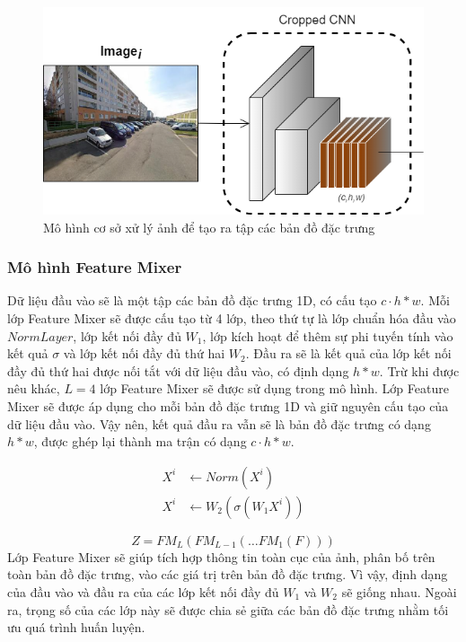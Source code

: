 \begin{figure}[H]
  \centering
  \includegraphics[scale=0.6]{pics/Proposal/cropped-cnn.png}
  \caption{Mô hình cơ sở xử lý ảnh để tạo ra tập các bản đồ đặc trưng \cite{alibey2023mixvpr}}
\end{figure}

\subsubsection{Mô hình Feature Mixer}

Dữ liệu đầu vào sẽ là một tập các bản đồ đặc trưng 1D, có cấu tạo $c \cdot h*w$. Mỗi lớp Feature Mixer sẽ được cấu tạo từ 4 lớp, theo thứ tự là lớp chuẩn hóa đầu vào $NormLayer$, lớp kết nối đầy đủ $W_1$, lớp kích hoạt để thêm sự phi tuyến tính vào kết quả $\sigma$ và lớp kết nối đầy đủ thứ hai $W_2$. Đầu ra sẽ là kết quả của lớp kết nối đầy đủ thứ hai được nối tắt với dữ liệu đầu vào, có định dạng $h*w$. Trừ khi được nêu khác, $L=4$ lớp Feature Mixer sẽ được sử dụng trong mô hình. Lớp Feature Mixer sẽ được áp dụng cho mỗi bản đồ đặc trưng 1D và giữ nguyên cấu tạo của dữ liệu đầu vào. Vậy nên, kết quả đầu ra vẫn sẽ là bản đồ đặc trưng có dạng $h*w$, được ghép lại thành ma trận có dạng $c \cdot h*w$.

$$
  \begin{aligned}
    X^{i} & \leftarrow Norm(X^{i})            \\
    X^{i} & \leftarrow W_2(\sigma(W_1 X^{i}))
  \end{aligned}
$$

$$
  Z = FM_L(FM_{L-1}(\dots FM_1(F)))
$$
\newpage
Lớp Feature Mixer sẽ giúp tích hợp thông tin toàn cục của ảnh, phân bố trên toàn bản đồ đặc trưng, vào các giá trị trên bản đồ đặc trưng. Vì vậy, định dạng của đầu vào và đầu ra của các lớp kết nối đầy đủ $W_1$ và $W_2$ sẽ giống nhau. Ngoài ra, trọng số của các lớp này sẽ được chia sẻ giữa các bản đồ đặc trưng nhằm tối ưu quá trình huấn luyện.

